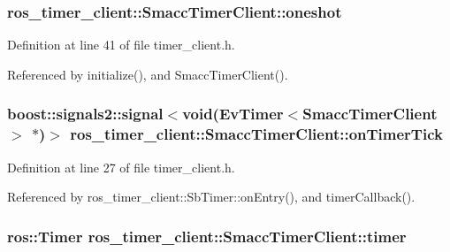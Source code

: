 \subsubsection[{\texorpdfstring{oneshot}{oneshot}}]{ ros\+\_\+timer\+\_\+client\+::\+Smacc\+Timer\+Client\+::oneshot\hspace{0.3cm}{\ttfamily [protected]}}\hypertarget{classros__timer__client_1_1SmaccTimerClient_a34bff666381b2a35860a7cf9ab6427e9}{}\label{classros__timer__client_1_1SmaccTimerClient_a34bff666381b2a35860a7cf9ab6427e9}


Definition at line 41 of file timer\+\_\+client.\+h.



Referenced by initialize(), and Smacc\+Timer\+Client().

\subsubsection[{\texorpdfstring{on\+Timer\+Tick}{onTimerTick}}]{\setlength{\rightskip}{0pt plus 5cm}boost\+::signals2\+::signal$<$void({\bf Ev\+Timer}$<${\bf Smacc\+Timer\+Client}$>$ $\ast$)$>$ ros\+\_\+timer\+\_\+client\+::\+Smacc\+Timer\+Client\+::on\+Timer\+Tick}\hypertarget{classros__timer__client_1_1SmaccTimerClient_aa9219b9e3278fcbd3f8fbe82bfc7a33f}{}\label{classros__timer__client_1_1SmaccTimerClient_aa9219b9e3278fcbd3f8fbe82bfc7a33f}


Definition at line 27 of file timer\+\_\+client.\+h.



Referenced by ros\+\_\+timer\+\_\+client\+::\+Sb\+Timer\+::on\+Entry(), and timer\+Callback().

\subsubsection[{\texorpdfstring{timer}{timer}}]{\setlength{\rightskip}{0pt plus 5cm}ros\+::\+Timer ros\+\_\+timer\+\_\+client\+::\+Smacc\+Timer\+Client\+::timer\hspace{0.3cm}{\ttfamily [protected]}}\hypertarget{classros__timer__client_1_1SmaccTimerClient_a950dfb5b2a2c699d2f260b1acda4fd93}{}\label{classros__timer__client_1_1SmaccTimerClient_a950dfb5b2a2c699d2f260b1acda4fd93}


